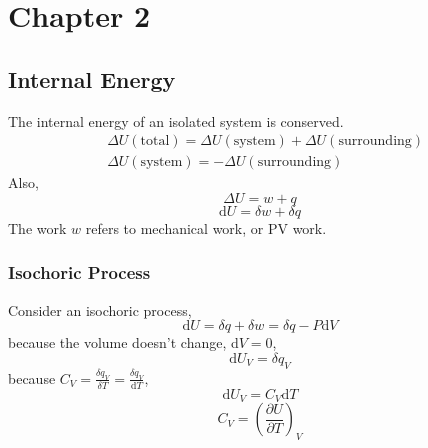 \documentclass[letterpaper]{article}
\newcommand{\diff}{\mathrm{d}}
\begin{document}
\newpage
\section*{Chapter 2}
\subsection*{Internal Energy}
The internal energy of an isolated system is conserved.
\begin{equation*}
    \begin{aligned}
        &\Delta U(\mathrm{total})=\Delta U(\mathrm{system})+\Delta U(\mathrm{surrounding})\\
        &\Delta U(\mathrm{system})=-\Delta U(\mathrm{surrounding})
    \end{aligned}
\end{equation*}
Also,
\begin{equation*}
    \Delta U=w+q
\end{equation*}
\begin{equation*}
    \diff U=\delta w+\delta q
\end{equation*}
The work $w$ refers to mechanical work, or PV work.
\subsubsection*{Isochoric Process}
Consider an isochoric process,
\begin{equation*}
    \diff U=\delta q + \delta w = \delta q - P\diff V
\end{equation*}
because the volume doesn't change, d$V=0$,
\begin{equation*}
    \diff U_V=\delta q_V
\end{equation*}
because $C_V=\frac{\delta q_V}{\delta T}=\frac{\delta q_V}{\diff T}$,
\begin{equation*}
    \diff U_V=C_V\diff T
\end{equation*}
\begin{equation*}
    \boxed{C_V=(\frac{\partial U}{\partial T})_V}
\end{equation*}
\end{document}
